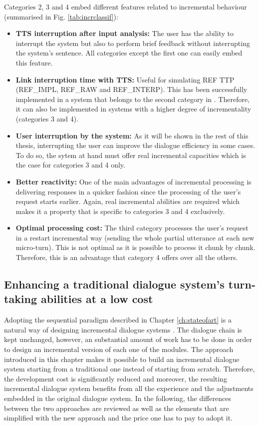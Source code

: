 		Categories 2, 3 and 4 embed different features related to incremental behaviour (summarised in Fig. \ref{tab:incrclassif}):

                \begin{itemize}
                  \item \textbf{TTS interruption after input analysis:} The user has the ability to interrupt the system but also to perform brief feedback without interrupting the system's sentence. All categories except the first one can easily embed this feature.
                  \item \textbf{Link interruption time with TTS:} Useful for simulating REF TTP (REF\_IMPL, REF\_RAW and REF\_INTERP). This has been successfully implemented in a system that belongs to the second category in \cite{El-Asri2014a}. Therefore, it can also be implemented in systems with a higher degree of incrementality (categories 3 and 4).
                  \item \textbf{User interruption by the system:} As it will be shown in the rest of this thesis, interrupting the user can improve the dialogue efficiency in some cases. To do so, the sytem at hand must offer real incremental capacities which is the case for categories 3 and 4 only.
                  \item \textbf{Better reactivity:} One of the main advantages of incremental processing is delivering responses in a quicker fashion since the processing of the user's request starts earlier. Again, real incremental abilities are required which makes it a property that is specific to categories 3 and 4 exclusively.
                  \item \textbf{Optimal processing cost:} The third category processes the user's request in a restart incremental way (sending the whole partial utterance at each new micro-turn). This is not optimal as it is possible to process it chunk by chunk. Therefore, this is an advantage that category 4 offers over all the others.
                \end{itemize}

	\subsection{Enhancing a traditional dialogue system's turn-taking abilities at a low cost}
    
             Adopting the sequential paradigm described in Chapter \ref{ch:stateofart} is a natural way of designing incremental dialogue systems \cite{Schlangen2011}. The dialogue chain is kept unchanged, however, an substantial amount of work has to be done in order to design an incremental version of each one of the modules. The approach introduced in this chapter makes it possible to build an incremental dialogue system starting from a traditional one instead of starting from scratch. Therefore, the development cost is significantly reduced and moreover, the resulting incremental dialogue system benefits from all the experience and the adjustments embedded in the original dialogue system. In the following, the differences between the two approaches are reviewed as well as the elements that are simplified with the new approach and the price one has to pay to adopt it.

